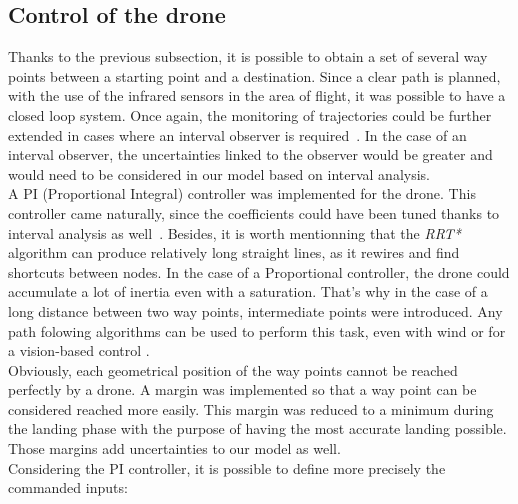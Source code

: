 \documentclass[letterpaper, 10 pt, conference]{ieeeconf}  %
\begin{document}
\subsection{Control of the drone}
Thanks to the previous subsection, it is possible to obtain a set of several way points between a starting point and a destination. Since a clear path is planned, with the use of the infrared sensors in the area of flight, it was possible to have a closed loop system. Once again, the monitoring of trajectories could be further extended in cases where an interval observer is required~\cite{Quadrotors Observer}. In the case of an interval observer, the uncertainties linked to the observer would be greater and would need to be considered in our model based on interval analysis. \\

A PI (Proportional Integral) controller was implemented for the drone. This controller came naturally, since the coefficients could have been tuned thanks to interval analysis as well~\cite{PI}. Besides, it is worth mentionning that the \textit{RRT*} algorithm can produce relatively long straight lines, as it rewires and find shortcuts between nodes. In the case of a Proportional controller, the drone could accumulate a lot of inertia even with a saturation. That's why in the case of a long distance between two way points, intermediate points were introduced. Any path folowing algorithms can be used to perform this task, even with wind\cite{pathfol} or for a vision-based control \cite{pathfol2}.\\


Obviously, each geometrical position of the way points cannot be reached perfectly by a drone. A margin was implemented so that a way point can be considered reached more easily. This margin was reduced to a minimum during the landing phase with the purpose of having the most accurate landing possible. Those margins add uncertainties to our model as well.\\

Considering the PI controller, it is possible to define more precisely the commanded inputs:
\end{document}
